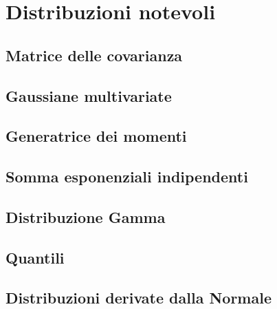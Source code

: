 
\chapter{Distribuzioni notevoli}
    \section{Matrice delle covarianza}
    \section{Gaussiane multivariate}
    \section{Generatrice dei momenti}
    \section{Somma esponenziali indipendenti}
    \section{Distribuzione Gamma}
    \section{Quantili}
    \section{Distribuzioni derivate dalla Normale}
